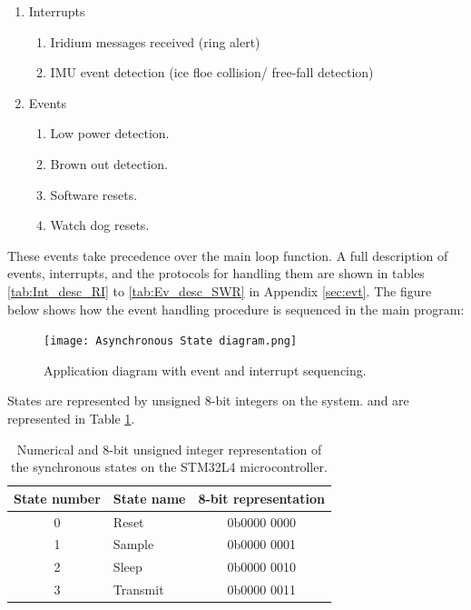 \begin{enumerate}
	\item Interrupts
	\begin{enumerate}
		\item Iridium messages received (ring alert)
		\item IMU event detection (ice floe collision/ free-fall detection)
	\end{enumerate}
	\item Events
	\begin{enumerate}
		\item Low power detection.
		\item Brown out detection.
		\item Software resets.
		\item Watch dog resets.
	\end{enumerate}
\end{enumerate}

These events take precedence over the main loop function. A full description of events, interrupts, and the protocols for handling them are shown in tables \ref{tab:Int_desc_RI} to \ref{tab:Ev_desc_SWR} in Appendix \ref{sec:evt}. The figure below shows how the event handling procedure is sequenced in the main program:

\begin{figure}[H]
	\centering
	\texttt{[image: Asynchronous State diagram.png]}
	\caption{Application diagram with event and interrupt sequencing.}
	\label{fig:main software}
\end{figure}

States are represented by unsigned 8-bit integers on the system. and are represented in Table \ref{tab:state_bit}.

\begin{table}[H]
	\centering
	\caption{Numerical and 8-bit unsigned integer representation of the synchronous states on the STM32L4 microcontroller.}
	\label{tab:state_bit}
	\setlength{\textwidth}{5pt}
	\begin{tabular}{clc}
		\hline
		\textbf{State number} & \textbf{State name} & \textbf{8-bit representation}\\
		\hline
		\hline
		0 &Reset 	&  	0b0000 0000\\
		\hline
		1 &Sample 	& 	0b0000 0001\\ 
		\hline
		2 &Sleep 	&  	0b0000 0010\\
		\hline
		3 &Transmit & 	0b0000 0011\\
		\hline
		\hline
	\end{tabular}
\end{table}

